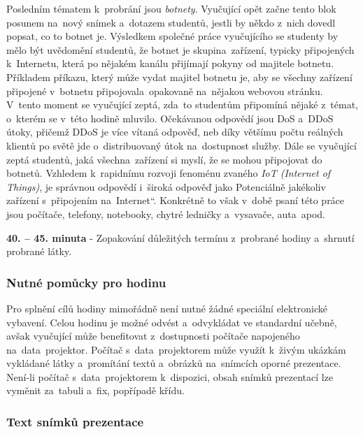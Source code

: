 \documentclass[a4paper, 12pt]{article}
\providecommand{\uv}[1]{\quotedblbase #1\textquotedblleft}
\begin{document}
Posledním tématem k~probrání jsou \textit{botnety}. Vyučující opět začne tento blok posunem na~nový snímek a~dotazem studentů, jestli by někdo z~nich dovedl popsat, co to botnet je. Výsledkem společné práce vyučujícího se studenty by mělo být uvědomění studentů, že botnet je skupina~zařízení, typicky připojených k~Internetu, která po nějakém kanálu přijímají pokyny od majitele botnetu. Příkladem příkazu, který může vydat majitel botnetu je, aby se všechny zařízení připojené v~botnetu připojovala~opakovaně na~nějakou webovou stránku. V~tento moment se vyučující zeptá, zda~to studentům připomíná nějaké z~témat, o~kterém se v~této hodině mluvilo. Očekávanou odpovědí jsou DoS a~DDoS útoky, přičemž DDoS je více vítaná odpověď, neb díky většímu počtu reálných klientů po světě jde o~distribuovaný útok na~dostupnost služby. Dále se vyučující zeptá studentů, jaká všechna~zařízení si myslí, že se mohou připojovat do botnetů. Vzhledem k~rapidnímu rozvoji fenoménu zvaného \textit{IoT (Internet of Things)}, je správnou odpovědí i~široká odpověď jako \uv{Potenciálně jakékoliv zařízení s~připojením na~Internet}. Konkrétně to však v~době psaní této práce jsou počítače, telefony, notebooky, chytré ledničky a~vysavače, auta~apod.

\textbf{40. -- 45. minuta} - Zopakování důležitých termínu z~probrané hodiny a~shrnutí probrané látky.

\subsubsection{Nutné pomůcky pro hodinu}
Pro splnění cílů hodiny mimořádně není nutné žádné speciální elektronické vybavení. Celou hodinu je možné odvést a~odvykládat ve standardní učebně, avšak vyučující může benefitovat z~dostupnosti počítače napojeného na~data~projektor. Počítač s~data~projektorem může využít k~živým ukázkám vykládané látky a~promítání textů a~obrázků na~snímcích oporné prezentace. Není-li počítač s~data~projektorem k~dispozici, obsah snímků prezentací lze vyměnit za~tabuli a~fix, popřípadě křídu.

\subsubsection{Text snímků prezentace}





\newpage
\end{document}
